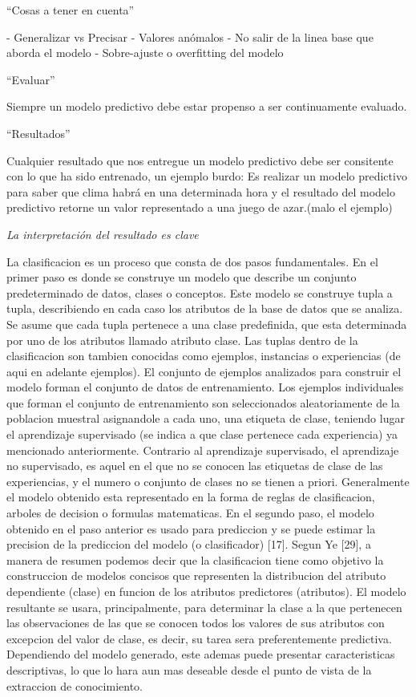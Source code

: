 ``Cosas a tener en cuenta'' 

- Generalizar vs Precisar
- Valores anómalos
- No salir de la linea base que aborda el modelo
- Sobre-ajuste o overfitting del modelo




``Evaluar''

Siempre un modelo predictivo debe estar propenso a ser continuamente evaluado.




``Resultados''

Cualquier resultado que nos entregue un modelo predictivo debe ser consitente con lo que ha sido entrenado, un ejemplo burdo:  Es realizar un modelo predictivo para saber que clima habrá en una determinada hora y el resultado del modelo predictivo retorne un valor representado a una juego de azar.(malo el ejemplo)

\emph{La interpretación del resultado es clave}







La clasificacion es un proceso que consta de dos pasos fundamentales. En el primer paso es donde se construye un modelo que describe un conjunto predeterminado de datos, clases o conceptos. Este modelo se construye tupla a tupla, describiendo en cada caso los atributos de la base de datos que se analiza. Se asume que cada tupla pertenece a una clase predefinida, que esta determinada por uno de los atributos llamado atributo clase. Las tuplas dentro de la clasificacion son tambien conocidas como ejemplos, instancias o experiencias (de aqui en adelante ejemplos). El conjunto de ejemplos analizados para construir el modelo forman el conjunto de datos de entrenamiento. Los ejemplos individuales que forman el conjunto de entrenamiento son seleccionados aleatoriamente de la poblacion muestral asignandole a cada uno, una etiqueta de clase, teniendo lugar el aprendizaje supervisado (se indica a que clase pertenece cada experiencia) ya mencionado anteriormente. Contrario al aprendizaje supervisado, el aprendizaje no supervisado, es aquel en el que no se conocen las etiquetas de clase de las experiencias, y el numero o conjunto de clases no se tienen a priori. Generalmente el modelo obtenido esta representado en la forma de reglas de clasificacion, arboles de decision o formulas matematicas. En el segundo paso, el modelo obtenido en el paso anterior es usado para prediccion y se puede estimar la precision de la prediccion del modelo (o clasificador) [17].
Segun Ye [29], a manera de resumen podemos decir que la clasificacion tiene como objetivo la construccion de modelos concisos que representen la distribucion
del atributo dependiente (clase) en funcion de los atributos predictores (atributos). El modelo resultante se usara, principalmente, para determinar la clase a la que pertenecen las observaciones de las que se conocen todos los valores de sus atributos con excepcion del valor de clase, es decir, su tarea sera preferentemente predictiva. Dependiendo del modelo generado, este ademas puede presentar caracteristicas descriptivas, lo que lo hara aun mas deseable desde el punto de vista de la extraccion de conocimiento.

